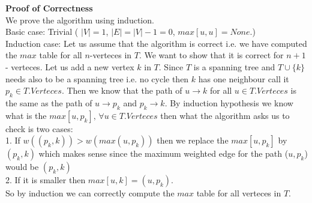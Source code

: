 \documentclass[10pt,a4paper]{article}
\begin{document}
\textbf{Proof of Correctness}\\
We prove the algorithm using induction.\\
Basic case: Trivial ( $|V| = 1$, $|E| = |V| -1 = 0$, $max[u,u] = None$.)\\
Induction case: Let us assume that the algorithm is correct i.e. we have computed the $max$ table for all $n$-verteces in $T$. We want to show that it is correct for $n+1$ - verteces. Let us add a new vertex $k$ in $T$. Since $T$ is a spanning tree and $T \cup \{k\}$ needs also to be a spanning tree i.e. no cycle then $k$ has one neighbour call it $ p_k \in T.Verteces$. Then we know that the path of $u  \rightarrow k$ for all $u \in T.Verteces$ is the same as the path of $u \rightarrow p_k$ and $p_k \rightarrow k$. By induction hypothesis we know what is the $max[u,p_k],\, \forall u \in T.Verteces$ then what the algorithm asks us to check is two cases:\\
1. If $w((p_k,k)) > w(max(u,p_k))$ then we replace the $max[u,p_k]$ by $(p_k,k)$ which makes sense since the maximum weighted edge for the path ($u,p_k$) would be $(p_k,k)$\\
2. If it is smaller then $max[u,k]= (u,p_k)$. \\
So by induction we can correctly compute the $max$ table for all verteces in $T$.\\
\end{document}
